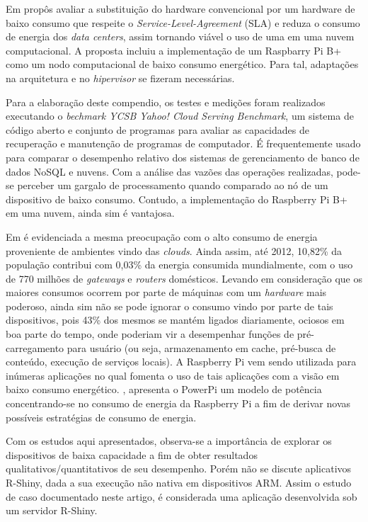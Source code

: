 \documentclass[12pt,english,brazil]{article}
\begin{document}
Em \cite{Joao} propôs avaliar a substituição do hardware convencional por um hardware de baixo consumo que respeite o \emph{Service-Level-Agreement} (SLA) e reduza o consumo de energia dos \emph{data centers}, assim tornando viável o uso de uma em uma nuvem computacional. A proposta incluiu a implementação de um Raspbarry Pi B+ como um nodo computacional de baixo consumo energético. Para tal, adaptações na arquitetura e no \emph{hipervisor} se fizeram necessárias.

Para a elaboração deste compendio, os testes e medições foram realizados executando o \emph{bechmark YCSB Yahoo! Cloud Serving Benchmark}, um sistema de código aberto e conjunto de programas para avaliar as capacidades de recuperação e manutenção de programas de computador. É frequentemente usado para comparar o desempenho relativo dos sistemas de gerenciamento de banco de dados NoSQL e nuvens. Com a análise das vazões das operações realizadas, pode-se perceber um gargalo de processamento quando comparado ao nó de um dispositivo de baixo consumo. Contudo, a implementação do Raspberry Pi B+ em uma nuvem, ainda sim é vantajosa.

Em \cite{PiConsumo} é evidenciada a mesma preocupação com o alto consumo de energia proveniente de ambientes vindo das \emph{clouds}. Ainda assim, até 2012, 10,82\% da população contribui com 0,03\% da energia consumida mundialmente, com o uso de 770 milhões de \emph{gateways} e \emph{routers} domésticos. Levando em consideração que os maiores consumos ocorrem por parte de máquinas com um \emph{hardware} mais poderoso, ainda sim não se pode ignorar o consumo vindo por parte de tais dispositivos, pois 43\% dos mesmos se mantém ligados diariamente, ociosos em boa parte do tempo, onde poderiam vir a desempenhar funções de pré-carregamento para usuário (ou seja, armazenamento em cache, pré-busca de conteúdo, execução de serviços locais). A Raspberry Pi vem sendo utilizada para inúmeras aplicações no qual fomenta o uso de tais aplicações com a visão em baixo consumo energético. \cite{PiConsumo}, apresenta o PowerPi um modelo de  potência concentrando-se no consumo de energia da Raspberry Pi a fim de derivar novas possíveis estratégias de consumo de energia.

Com os estudos aqui apresentados, observa-se a importância de explorar os dispositivos de baixa capacidade a fim de obter resultados qualitativos/quantitativos de seu desempenho. Porém não se discute aplicativos R-Shiny, dada a sua execução não nativa em dispositivos ARM. Assim o estudo de caso documentado neste artigo, é considerada uma aplicação desenvolvida sob um servidor R-Shiny.
\end{document}
